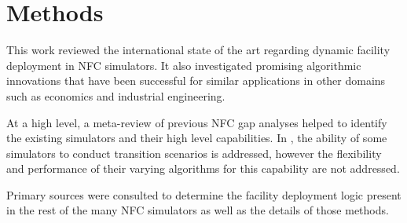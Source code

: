 \section{Methods}

This work reviewed the international state of the art regarding dynamic 
facility deployment in \gls{NFC} simulators. It also investigated promising 
algorithmic innovations that have been successful for similar applications in 
other domains such as economics and industrial engineering.

At a high level, a meta-review of previous \gls{NFC} gap analyses 
\cite{stuff,stuff} helped to identify the existing simulators and their high 
level capabilities. In \cite{stuff}, the ability of some simulators to conduct 
transition scenarios is addressed, however the flexibility and performance of their varying 
algorithms for this capability are not addressed. 

Primary sources were consulted to determine the facility deployment logic present in the 
rest of the many \gls{NFC} simulators as well as the details of those methods.
